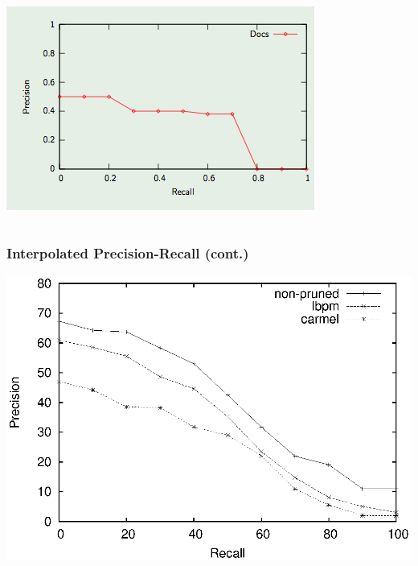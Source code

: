 \documentclass[svgnames]{beamer}
\begin{document}
\begin{frame}
\begin{columns}

          \includegraphics[width=.8\linewidth]{pr.png}\\

    \end{columns}
\end{frame}


\begin{frame}
  \frametitle{Interpolated Precision-Recall (cont.)}
  
  \begin{example}
    \begin{center}
      \includegraphics[width=0.8\linewidth]{size90.eps}
    \end{center}
  \end{example}
\end{frame}

\end{document}
